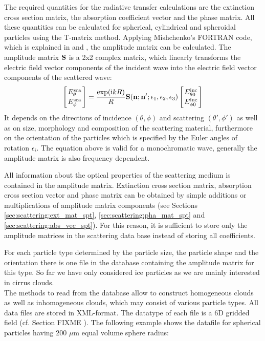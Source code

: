 \label{sec:scattering:amp_mat_data}

The required quantities for the radiative transfer calculations are
the  extinction cross section matrix, the
absorption coefficient vector and the phase
matrix. All these quantities can be calculated for spherical,
cylindrical and spheroidal particles using the T-matrix
method. Applying Mishchenko's FORTRAN code, which is explained in
\citet{Mishchenko:98} and \citet{Mishchenko:00},   
the amplitude matrix can be calculated. The
amplitude matrix ${\bf S}$ is a 2x2 complex matrix, which linearly transforms 
the electric field vector components of the incident wave into the
electric field vector components of the scattered wave:  
\begin{eqnarray}
  \label{eq:ampl_matrix}
  \left[{E^{\rm sca}_{\theta}\atop E^{\rm sca}_{\phi}}\right] =
  \frac{\exp({\rm i} kR)}{R}{\bf S}({\bf n};{\bf
      n'};\epsilon_1,\epsilon_2,\epsilon_3)\left[{E^{\rm inc}_{\theta
          0}\atop E^{\rm inc}_{\phi 0}}\right] 
\end{eqnarray}
It depends on the directions of incidence  $(\theta,
\phi)$  and
scattering $(\theta', \phi')$ as  well as on size, morphology and composition of the
scattering material, furthermore on the orientation of the particles which
is specified by the Euler angles of rotation $\epsilon _i$. 
The equation above is valid for a monochromatic wave, generally the
amplitude matrix is also frequency dependent.

All information about the optical
properties of the scattering medium is contained in the amplitude
matrix. Extinction cross section
matrix, absorption cross section vector and phase matrix can be
obtained by simple additions or multiplications of amplitude matrix
components (see Sections
\ref{sec:scattering:ext_mat_spt}, \ref{sec:scattering:pha_mat_spt}  and
\ref{sec:scattering:abs_vec_spt}).
For this reason, it is sufficient to store only the amplitude matrices
in the scattering data base instead of storing all coefficients. 

For each particle type determined by the particle size, the particle
shape and the
orientation there is one file in the database  containing the
amplitude matrix for this type.
So far we have only considered ice particles as we are mainly
interested in cirrus clouds.\\
The methods to read from the database allow to construct homogeneous
clouds as well as inhomogeneous clouds, which may consist of various
particle types. 
All data files are stored in XML-format. The
datatype of each file is a 6D gridded field (cf. Section FIXME
). 
The following example shows the datafile
for spherical particles having 200 $\mu$m equal volume sphere radius:

